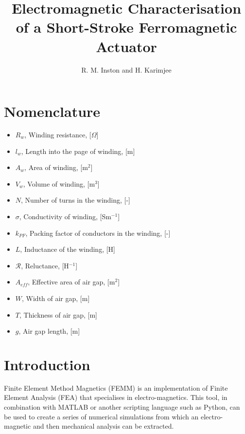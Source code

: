 \documentclass[a4paper]{IEEEtran}
\begin{document}
\title{Electromagnetic Characterisation of a Short-Stroke Ferromagnetic Actuator}
\author{R. M. Inston and H. Karimjee}

\maketitle

\section{Nomenclature}
    \begin{itemize}
    \item[]{$R_{w}$, Winding resistance, [$\Omega$]}
    \item[]{$l_{w}$, Length into the page of winding, [m]}
    \item[]{$A_{w}$, Area of winding, [m$^{2}$]}
    \item[]{$V_{w}$, Volume of winding, [m$^{3}$]}
    \item[]{$N$, Number of turns in the winding, [-]}
    \item[]{$\sigma$, Conductivity of winding, [Sm$^{-1}$]}
    \item[]{$k_{PF}$, Packing factor of conductors in the winding, [-]}
    \item[]{$L$, Inductance of the winding, [H]}
    \item[]{$\mathcal{R}$, Reluctance, [H$^{-1}$]}
    \item[]{$A_{eff}$, Effective area of air gap, [m$^{2}$]}
    \item[]{$W$, Width of air gap, [m]}
    \item[]{$T$, Thickness of air gap, [m]}
    \item[]{$g$, Air gap length, [m]}
    \end{itemize}

\section{Introduction}

    Finite Element Method Magnetics (FEMM) is an implementation of Finite Element Analysis (FEA) that specialises in electro-magnetics. This tool, in combination with MATLAB or another scripting language such as Python, can be used to create a series of numerical simulations from which an electro-magnetic and then mechanical analysis can be extracted. 
    
\end{document}

